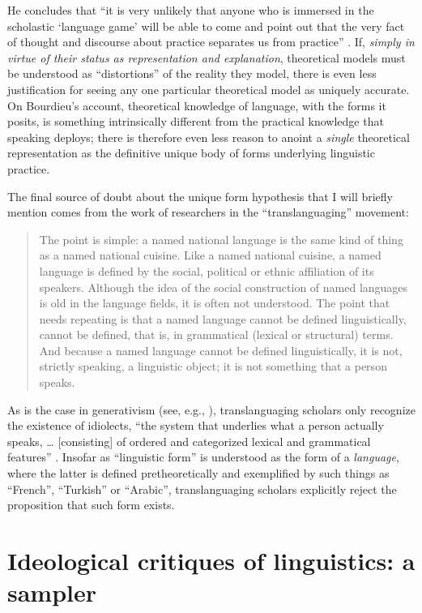 \documentclass[output=paper]{langscibook}
\begin{document}
He concludes that ``it is very unlikely that anyone who is immersed in the scholastic `language game' will be able to come and point out that the very fact of thought and discourse about practice separates us from practice'' \citep[52]{Bourdieu20031997}. If, \emph{simply in virtue of their status as representation and explanation}, theoretical models must be understood as ``distortions'' of the reality they model, there is even less justification for seeing any one particular theoretical model as uniquely accurate. On Bourdieu's account, theoretical knowledge of language, with the forms it posits, is something intrinsically different from the practical knowledge that speaking deploys; there is therefore even less reason to anoint a \emph{single} theoretical representation as the definitive unique body of forms underlying linguistic practice.

The final source of doubt about the unique form hypothesis that I will briefly mention comes from the work of researchers in the ``translanguaging'' movement: 

\begin{quotation}
The point is simple: a named national language is the same kind of thing as a named national cuisine. Like a named national cuisine, a named language is defined by the social, political or ethnic affiliation of its speakers. Although the idea of the social construction of named languages is old in the language fields, it is often not understood. The point that needs repeating is that a named language cannot be defined linguistically, cannot be defined, that is, in grammatical (lexical or structural) terms. And because a named language cannot be defined linguistically, it is not, strictly speaking, a linguistic object; it is not something that a person speaks. \citep[286]{OtheguyReid2015}
\end{quotation}

As is the case in generativism (see, e.g., \citealt{Chomsky2000horizons}), translanguaging scholars only recognize the existence of idiolects, ``the system that underlies what a person actually speaks, … [consisting] of ordered and categorized lexical and grammatical features'' \citep[289]{OtheguyReid2015}. Insofar as ``linguistic form'' is understood as the form of a \emph{language}, where the latter is defined pretheoretically and exemplified by such things as ``French'', ``Turkish'' or ``Arabic'', translanguaging scholars explicitly reject the proposition that such form exists.

\section{Ideological critiques of linguistics: a sampler}
\label{sec:riemer:ideologicalcritiques}
\end{document}
